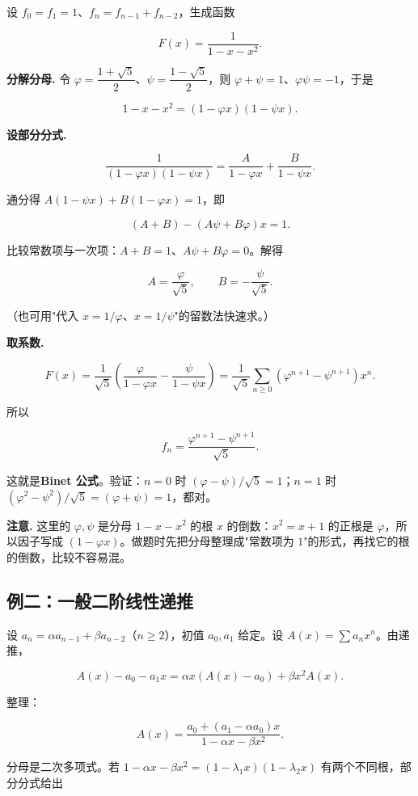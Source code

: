 设 $f_0=f_1=1$、$f_n=f_{n-1}+f_{n-2}$，生成函数

\[
F(x)=\frac{1}{1-x-x^2}.
\]

\textbf{分解分母.} 令 $\varphi=\dfrac{1+\sqrt5}{2}$、$\psi=\dfrac{1-\sqrt5}{2}$，则 $\varphi+\psi=1$、$\varphi\psi=-1$，于是

\[
1-x-x^2=(1-\varphi x)(1-\psi x).
\]

\textbf{设部分分式.}

\[
\frac{1}{(1-\varphi x)(1-\psi x)}=\frac{A}{1-\varphi x}+\frac{B}{1-\psi x}.
\]

通分得 $A(1-\psi x)+B(1-\varphi x)=1$，即

\[
(A+B)-(A\psi+B\varphi)x=1.
\]

比较常数项与一次项：$A+B=1$、$A\psi+B\varphi=0$。解得

\[
A=\frac{\varphi}{\sqrt5},\qquad B=-\frac{\psi}{\sqrt5}.
\]

（也可用"代入 $x=1/\varphi$、$x=1/\psi$"的留数法快速求。）

\textbf{取系数.}

\[
F(x)=\frac{1}{\sqrt5}\left(\frac{\varphi}{1-\varphi x}-\frac{\psi}{1-\psi x}\right)
=\frac{1}{\sqrt5}\sum_{n\ge0}(\varphi^{n+1}-\psi^{n+1})x^n.
\]

所以

\[
f_n=\frac{\varphi^{n+1}-\psi^{n+1}}{\sqrt5}.
\]

这就是\textbf{Binet 公式}。验证：$n=0$ 时 $(\varphi-\psi)/\sqrt5=1$；$n=1$ 时 $(\varphi^2-\psi^2)/\sqrt5=(\varphi+\psi)=1$，都对。

\textbf{注意.} 这里的 $\varphi,\psi$ 是分母 $1-x-x^2$ 的根 $x$ 的倒数：$x^2=x+1$ 的正根是 $\varphi$，所以因子写成 $(1-\varphi x)$。做题时先把分母整理成"常数项为 $1$"的形式，再找它的根的倒数，比较不容易混。

\subsection{例二：一般二阶线性递推}


设 $a_n=\alpha a_{n-1}+\beta a_{n-2}$（$n\ge2$），初值 $a_0,a_1$ 给定。设 $A(x)=\sum a_nx^n$。由递推，

\[
A(x)-a_0-a_1x=\alpha x(A(x)-a_0)+\beta x^2A(x).
\]

整理：

\[
A(x)=\frac{a_0+(a_1-\alpha a_0)x}{1-\alpha x-\beta x^2}.
\]

分母是二次多项式。若 $1-\alpha x-\beta x^2=(1-\lambda_1x)(1-\lambda_2x)$ 有两个不同根，部分分式给出

